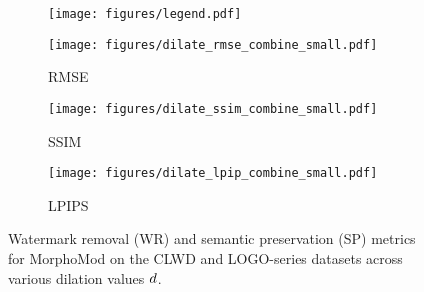 \begin{figure*}[tbh!]
\vskip 0.2in
\begin{center}
\begin{subfigure}{\textwidth}
    \centerline{\texttt{[image: figures/legend.pdf]}}
\end{subfigure}
\begin{subfigure}{0.33\textwidth}
    \centerline{\texttt{[image: figures/dilate\_rmse\_combine\_small.pdf]}}
    \caption{RMSE}
    \label{fig:dilate_rmse}
\end{subfigure}
\begin{subfigure}{0.33\textwidth}
    \centerline{\texttt{[image: figures/dilate\_ssim\_combine\_small.pdf]}}
    \caption{SSIM}
    \label{fig:dilate_ssim}
\end{subfigure}
\begin{subfigure}{0.33\textwidth}
    \centerline{\texttt{[image: figures/dilate\_lpip\_combine\_small.pdf]}}
    \caption{LPIPS}
    \label{fig:dilate_lpips}
\end{subfigure}
\caption{Watermark removal (WR) and semantic preservation (SP) metrics for MorphoMod on the CLWD and LOGO-series datasets across various dilation values $d$.}
\label{fig:dilate}
\end{center}
\vskip -0.2in
\end{figure*}